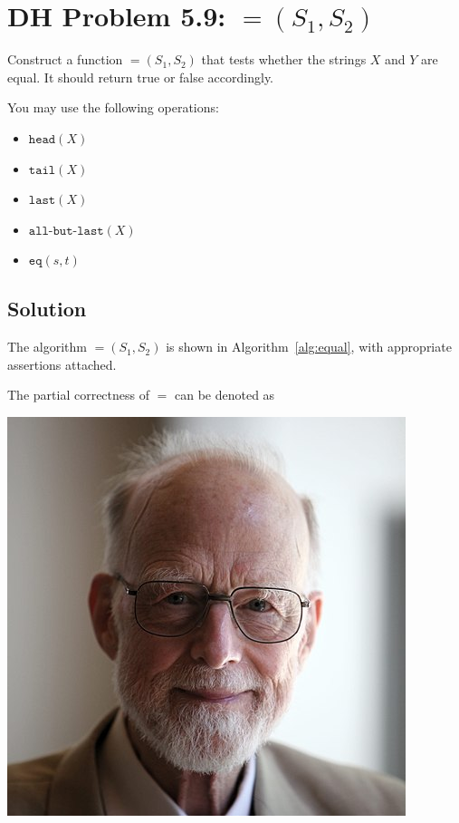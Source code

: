 
\section{DH Problem 5.9: $\equal(S_1, S_2)$}  \label{section:problem-5.9}
  Construct a function $\equal(S_1, S_2)$ that tests whether the strings $X$ and $Y$ are equal.
  It should return true or false accordingly.

  You may use the following operations:
  \begin{itemize}
    \item $\texttt{head}(X)$
    \item $\texttt{tail}(X)$
    \item $\texttt{last}(X)$
    \item $\texttt{all-but-last}(X)$
    \item $\texttt{eq}(s,t)$
  \end{itemize}
\subsection{Solution}

The algorithm $\equal(S_1, S_2)$ is shown in Algorithm~\ref{alg:equal},
with appropriate assertions attached.

The partial correctness of $\equal$ can be denoted as

\begin{marginfigure}%
  \includegraphics[width=0.60\linewidth]{figs/tony-hoare}
  \label{fig:hoare}
\end{marginfigure}



